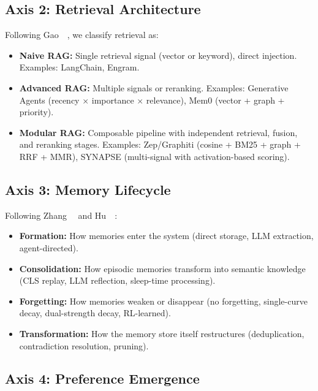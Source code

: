 \subsection{Axis 2: Retrieval Architecture}

Following Gao~\etal~\cite{gao2023rag}, we classify retrieval as:

\begin{itemize}[leftmargin=*, nosep]
    \item \textbf{Naive RAG:} Single retrieval signal (vector or
    keyword), direct injection. Examples: LangChain, Engram.
    \item \textbf{Advanced RAG:} Multiple signals or reranking.
    Examples: Generative Agents (recency $\times$ importance $\times$
    relevance), Mem0 (vector + graph + priority).
    \item \textbf{Modular RAG:} Composable pipeline with independent
    retrieval, fusion, and reranking stages. Examples: Zep/Graphiti
    (cosine + BM25 + graph + RRF + MMR), SYNAPSE (multi-signal with
    activation-based scoring).
\end{itemize}

\subsection{Axis 3: Memory Lifecycle}

Following Zhang~\etal~\cite{zhang2024survey} and
Hu~\etal~\cite{hu2025memory}:

\begin{itemize}[leftmargin=*, nosep]
    \item \textbf{Formation:} How memories enter the system (direct
    storage, LLM extraction, agent-directed).
    \item \textbf{Consolidation:} How episodic memories transform into
    semantic knowledge (CLS replay, LLM reflection, sleep-time
    processing).
    \item \textbf{Forgetting:} How memories weaken or disappear
    (no forgetting, single-curve decay, dual-strength decay, RL-learned).
    \item \textbf{Transformation:} How the memory store itself
    restructures (deduplication, contradiction resolution, pruning).
\end{itemize}

\subsection{Axis 4: Preference Emergence}

